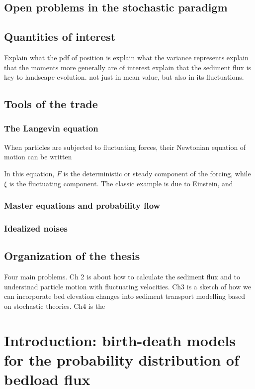 \subsection{Open problems in the stochastic paradigm}

\subsection{Quantities of interest}
Explain what the pdf of position is
explain what the variance represents
explain that the moments more generally are of interest
explain that the sediment flux is key to landscape evolution. not just in mean value, but also in its fluctuations.


\subsection{Tools of the trade}

\subsubsection{The Langevin equation}
When particles are subjected to fluctuating forces, their Newtonian equation of motion can be written

In this equation, $F$ is the deterministic or steady component of the forcing, while $\xi$ is the fluctuating component. 
The classic example is due to Einstein, and 
\subsubsection{Master equations and probability flow}

\subsubsection{Idealized noises}


\subsection{Organization of the thesis}

Four main problems. Ch 2 is about how to calculate the sediment flux and to understnad particle motion with fluctuating velocities.
Ch3 is a sketch of how we can incorporate bed elevation changes into sediment transport modelling based on stochastic theories.
Ch4 is the 

\section{Introduction: birth-death models for the probability distribution of bedload flux}

